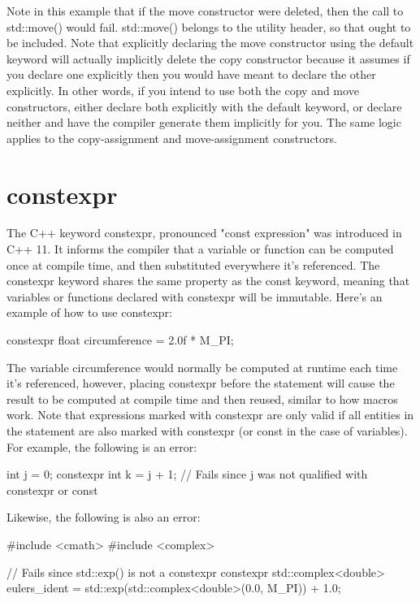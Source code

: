 \documentclass{article}
\begin{document}
Note in this example that if the move constructor were deleted, then the call to std::move() would fail.
std::move() belongs to the utility header, so that ought to be included. Note that explicitly declaring the
move constructor using the default keyword will actually implicitly delete the copy constructor because it
assumes if you declare one explicitly then you would have meant to declare the other explicitly. In other
words, if you intend to use both the copy and move constructors, either declare both explicitly with the
default keyword, or declare neither and have the compiler generate them implicitly for you. The same logic
applies to the copy-assignment and move-assignment constructors.

\section{constexpr}

The C++ keyword constexpr, pronounced "const expression" was introduced in C++ 11. It informs the compiler
that a variable or function can be computed once at compile time, and then substituted everywhere it's
referenced. The constexpr keyword shares the same property as the const keyword, meaning that variables or
functions declared with constexpr will be immutable. Here's an example of how to use constexpr:

\begin{cpplst}
constexpr float circumference = 2.0f * M_PI;
\end{cpplst}

The variable circumference would normally be computed at runtime each time it's referenced, however, placing
constexpr before the statement will cause the result to be computed at compile time and then reused, similar
to how macros work. Note that expressions marked with constexpr are only valid if all entities in the
statement are also marked with constexpr (or const in the case of variables). For example, the following is
an error:

\begin{cpplst}
int j = 0;
constexpr int k = j + 1; // Fails since j was not qualified with constexpr or const
\end{cpplst}

Likewise, the following is also an error:

\begin{cpplst}
#include <cmath>
#include <complex>

// Fails since std::exp() is not a constexpr
constexpr std::complex<double> eulers_ident = std::exp(std::complex<double>(0.0, M_PI)) + 1.0;
\end{cpplst}
\end{document}
